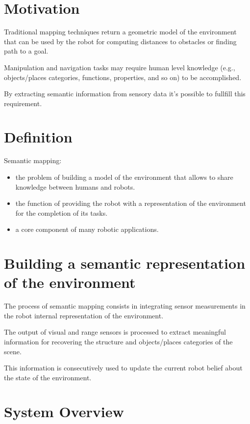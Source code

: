 \documentclass{article}
\begin{document}
	

	\section{Motivation}
	
	Traditional mapping techniques return a geometric model of the environment that can be used by the robot for computing distances to obstacles or finding path to a goal.
	
	Manipulation and navigation tasks may require human level knowledge (e.g., objects/places categories, functions, properties, and so on) to be accomplished.
	
	By extracting semantic information from sensory data it's possible to fullfill this requirement.
	
	\section{Definition}
		
	Semantic mapping:
		
	\begin{itemize}
		\item the problem of building a model of the environment that allows to share knowledge between humans and robots.
		\item the function of providing the robot with a representation of the environment for the completion of its tasks.
		\item a core component of many robotic applications.
	\end{itemize}
		
	\section{Building a semantic representation of the environment}
	
	The process of semantic mapping consists in integrating sensor measurements in the robot internal representation of the environment.
	
	The output of visual and range sensors is processed to extract meaningful information for recovering the structure and objects/places categories of the scene.
		
	This information is consecutively used to update the current robot belief about the state of the environment.
	
	\section{System Overview}
	
\end{document}
